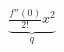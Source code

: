 \documentclass[preview]{standalone}
\begin{document}
\begin{align*}
\underbrace{\frac{f''(0)}{2!}x^2}_{q}
\end{align*}
\end{document}
